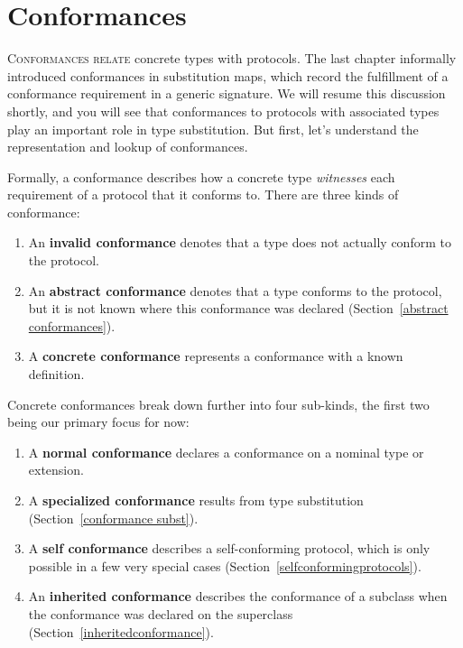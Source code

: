 \documentclass[../generics]{subfiles}
\begin{document}
\chapter{Conformances}\label{conformances}

\lettrine{C}{onformances relate} concrete types with protocols. The last chapter informally introduced conformances in substitution maps, which record the fulfillment of a conformance requirement in a generic signature. We will resume this discussion shortly, and you will see that conformances to protocols with associated types play an important role in type substitution. But first, let's understand the representation and lookup of conformances.

Formally, a conformance describes how a concrete type \emph{witnesses} each requirement of a protocol that it conforms to. There are three kinds of conformance:
\begin{enumerate}
\item An \textbf{invalid conformance} denotes that a type does not actually conform to the protocol.
\item An \textbf{abstract conformance} denotes that a type conforms to the protocol, but it is not known where this conformance was declared (Section~\ref{abstract conformances}).
\item A \textbf{concrete conformance} represents a conformance with a known definition.
\end{enumerate}

Concrete conformances break down further into four sub-kinds, the first two being our primary focus for now:
\begin{enumerate}
\item A \textbf{normal conformance} declares a conformance on a nominal type or extension.
\item A \textbf{specialized conformance} results from type substitution (Section~\ref{conformance subst}).
\item A \textbf{self conformance} describes a self-conforming protocol, which is only possible in a few very special cases (Section~\ref{selfconformingprotocols}).
\item An \textbf{inherited conformance} describes the conformance of a subclass when the conformance was declared on the superclass (Section~\ref{inheritedconformance}).
\end{enumerate}
\end{document}
